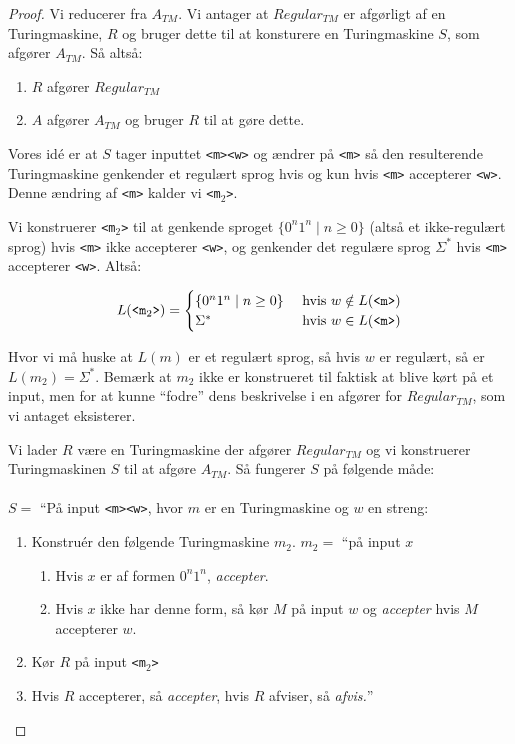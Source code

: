 \begin{proof}
	Vi reducerer fra $A_{TM}$. Vi antager at $Regular_{TM}$ er afgørligt af en Turingmaskine, $R$ og bruger dette til at konsturere en Turingmaskine $S$, som afgører $A_{TM}$. Så altså:
	\begin{enumerate}
		\item $R$ afgører $Regular_{TM}$
		\item $A$ afgører $A_{TM}$ og bruger $R$ til at gøre dette.
	\end{enumerate}

	Vores idé er at $S$ tager inputtet \texttt{<m><w>} og ændrer på \texttt{<m>} så den resulterende Turingmaskine genkender et regulært sprog hvis og kun hvis \texttt{<m>} accepterer \texttt{<w>}. Denne ændring af \texttt{<m>} kalder vi \texttt{<m$_{2}$>}.

	Vi konstruerer \texttt{<m$_{2}$>} til at genkende sproget $\{0^{n}1^{n} \mid n \ge 0\}$ (altså et ikke-regulært sprog) hvis \texttt{<m>} ikke accepterer \texttt{<w>}, og genkender det regulære sprog $\Sigma^{*}$ hvis \texttt{<m>} accepterer \texttt{<w>}. Altså:

	\begin{equation*}
		L(\text{\texttt{<m$_{2}$>}}) = \begin{cases}
			\{0^{n}1^{n} \mid n \ge 0\} & \text{ hvis } w \notin L(\text{\texttt{<m>}}) \\
			\Sigma^{*}                  & \text{ hvis } w \in L(\text{\texttt{<m>}})
		\end{cases}
	\end{equation*}

	Hvor vi må huske at $L(m)$ er et regulært sprog, så hvis $w$ er regulært, så er $L(m_{2}) = \Sigma^{*}$.
	Bemærk at $m_{2}$ ikke er konstrueret til faktisk at blive kørt på et input, men for at kunne ``fodre'' dens beskrivelse i en afgører for $Regular_{TM}$, som vi antaget eksisterer.

	Vi lader $R$ være en Turingmaskine der afgører $Regular_{TM}$ og vi konstruerer Turingmaskinen $S$ til at afgøre $A_{TM}$. Så fungerer $S$ på følgende måde:\\\\
	\noindent
	$S =$ ``På input \texttt{<m><w>}, hvor $m$ er en Turingmaskine og $w$ en streng:
	\begin{enumerate}
		\item Konstruér den følgende Turingmaskine $m_{2}$.
		      $m_{2} = $ ``på input $x$
		      \begin{enumerate}
			      \item Hvis $x$ er af formen $0^{n}1^{n}$, \textit{accepter}.
			      \item Hvis $x$ ikke har denne form, så kør $M$ på input $w$ og \textit{accepter} hvis $M$ accepterer $w$.
		      \end{enumerate}
		\item Kør $R$ på input \texttt{<m$_{2}$>}
		\item Hvis $R$ accepterer, så \textit{accepter}, hvis $R$ afviser, så \textit{afvis.}''
	\end{enumerate}



\end{proof}
